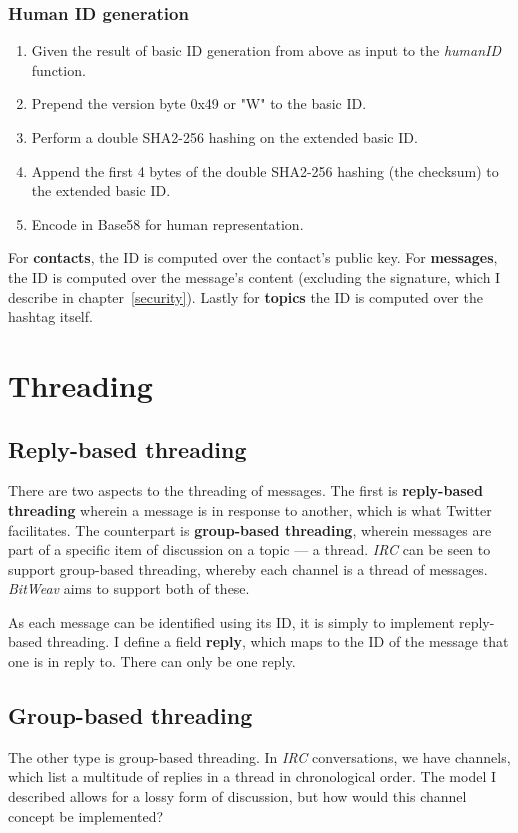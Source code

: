 \documentclass[10pt,a4paper,onecolumn]{article}
\begin{document}
\subsubsection*{Human ID generation}
\begin{enumerate}
\item Given the result of basic ID generation from above as input to the \emph{humanID} function.
\item Prepend the version byte 0x49 or "W" to the basic ID.
\item Perform a double SHA2-256 hashing on the extended basic ID.
\item Append the first 4 bytes of the double SHA2-256 hashing (the checksum) to the extended basic ID.
\item Encode in Base58 for human representation. 
\end{enumerate}

For \textbf{contacts}, the ID is computed over the contact's public key. For \textbf{messages}, the ID is computed over the message's content (excluding the signature, which I describe in chapter~\ref{security}). Lastly for \textbf{topics} the ID is computed over the hashtag itself.

\section{Threading}
\subsection*{Reply-based threading}
There are two aspects to the threading of messages. The first is \textbf{reply-based threading} wherein a message is in response to another, which is what Twitter facilitates. The counterpart is \textbf{group-based threading}, wherein messages are part of a specific item of discussion on a topic — a thread. \textit{IRC} can be seen to support group-based threading, whereby each channel is a thread of messages. \textit{BitWeav} aims to support both of these. 

As each message can be identified using its ID, it is simply to implement reply-based threading. I define a field \textbf{reply}, which maps to the ID of the message that one is in reply to. There can only be one reply. 

\subsection*{Group-based threading}
The other type is group-based threading. In \textit{IRC} conversations, we have channels, which list a multitude of replies in a thread in chronological order. The model I described allows for a lossy form of discussion, but how would this channel concept be implemented? 
\end{document}
